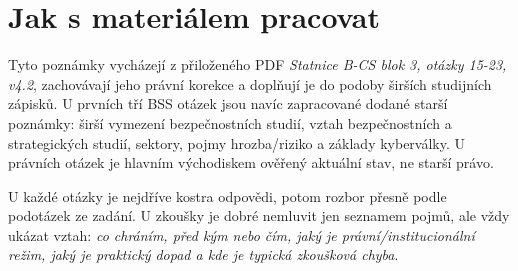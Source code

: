 \section*{Jak s materiálem pracovat}
Tyto poznámky vycházejí z přiloženého PDF \emph{Statnice B-CS blok 3, otázky 15-23, v4.2}, zachovávají jeho právní korekce a doplňují je do podoby širších studijních zápisků. U prvních tří BSS otázek jsou navíc zapracované dodané starší poznámky: širší vymezení bezpečnostních studií, vztah bezpečnostních a strategických studií, sektory, pojmy hrozba/riziko a základy kyberválky. U právních otázek je hlavním východiskem ověřený aktuální stav, ne starší právo.

U každé otázky je nejdříve kostra odpovědi, potom rozbor přesně podle podotázek ze zadání. U zkoušky je dobré nemluvit jen seznamem pojmů, ale vždy ukázat vztah: \emph{co chráním, před kým nebo čím, jaký je právní/institucionální režim, jaký je praktický dopad a kde je typická zkoušková chyba}.

